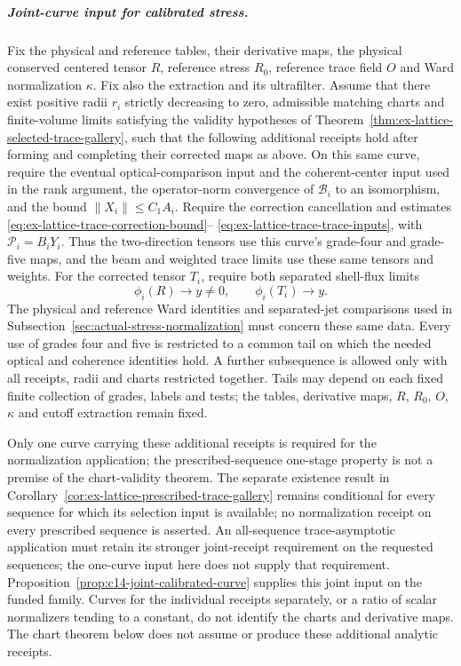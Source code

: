\subparagraph{Joint-curve input for calibrated stress.}
\label{par:ex-trace-joint-curve}
Fix the physical and reference tables, their derivative maps, the physical
conserved centered tensor $R$, reference stress $R_0$, reference trace field
$O$ and Ward normalization $\kappa$. Fix also the extraction and its
ultrafilter. Assume that there exist positive radii $r_i$ strictly
decreasing to zero, admissible matching charts and finite-volume limits
satisfying the validity hypotheses of
Theorem~\ref{thm:ex-lattice-selected-trace-gallery}, such that
the following additional receipts hold after forming and completing their
corrected maps as above. On this same curve, require the eventual optical-comparison
input and the coherent-center input used in the rank argument, the
operator-norm convergence of $\mathcal B_i$ to an isomorphism, and the
bound $\|X_i\|\le C_1A_i$. Require the correction cancellation and
estimates \eqref{eq:ex-lattice-trace-correction-bound}--
\eqref{eq:ex-lattice-trace-trace-inputs}, with $\mathcal P_i=B_iY_i$.
Thus the two-direction tensors use this curve's grade-four and grade-five
maps, and the beam and weighted trace limits use these same tensors and
weights. For the corrected tensor $T_i$, require both separated
shell-flux limits
\[
 \phi_i(R)\longrightarrow y\ne0,\qquad
 \phi_i(T_i)\longrightarrow y.
\]
The physical and reference Ward identities and separated-jet comparisons
used in Subsection~\ref{sec:actual-stress-normalization} must concern these
same data. Every use of grades four and five is restricted to a common
tail on which the needed optical and coherence identities hold.
A further subsequence is allowed only with all receipts, radii and charts
restricted together. Tails may depend on each fixed finite collection of
grades, labels and tests; the tables, derivative maps, $R$, $R_0$, $O$,
$\kappa$ and cutoff extraction remain fixed.

Only one curve carrying these additional receipts is required for the
normalization application; the prescribed-sequence one-stage property is
not a premise of the chart-validity theorem. The separate existence result
in Corollary~\ref{cor:ex-lattice-prescribed-trace-gallery}
remains conditional for every sequence for which its selection input is
available; no normalization receipt on every prescribed sequence is asserted.
An all-sequence trace-asymptotic application must retain its stronger
joint-receipt requirement on the requested sequences; the one-curve input
here does not supply that requirement.
Proposition~\ref{prop:c14-joint-calibrated-curve} supplies this joint input on the funded family. Curves for the individual receipts
separately, or a ratio of scalar normalizers tending to a constant, do not
identify the charts and derivative maps. The chart theorem below does not
assume or produce these additional analytic receipts.

